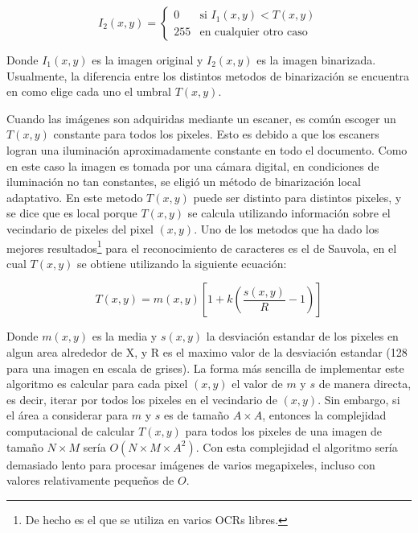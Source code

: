 \documentclass[a4paper, 11pt, oneside]{report}
\begin{document}
\begin{equation}\label{binEq}
	I_2(x,y) = \left\{ \begin{array}{ll}
		0   & \mbox{si $I_1(x,y) < T(x,y)$} \\
		255 & \mbox{en cualquier otro caso}
	\end{array} \right. 
\end{equation}

Donde $I_1(x,y)$ es la imagen original y $I_2(x,y)$ es la imagen binarizada. Usualmente, la diferencia entre los distintos metodos de binarización se encuentra en como elige cada uno el umbral $T(x,y)$.

Cuando las imágenes son adquiridas mediante un escaner, es común escoger un $T(x,y)$ constante para todos los pixeles. Esto es debido a que los escaners logran una iluminación aproximadamente constante en todo el documento. Como en este caso la imagen es tomada por una cámara digital, en condiciones de iluminación no tan constantes, se eligió un método de binarización local adaptativo. En este metodo $T(x,y)$ puede ser distinto para distintos pixeles, y se dice que es local porque $T(x,y)$ se calcula utilizando información sobre el vecindario de pixeles del pixel $(x,y)$. Uno de los metodos que ha dado los mejores resultados\footnote{De hecho es el que se utiliza en varios OCRs libres.} para el reconocimiento de caracteres es el de Sauvola, en el cual $T(x,y)$ se obtiene utilizando la siguiente ecuación:

\begin{equation}\label{rSauvola}
	T(x,y)=m(x,y)\left[ 1 + k(\frac{s(x,y)}{R}-1) \right]
\end{equation}

Donde $m(x,y)$ es la media y $s(x,y)$ la desviación estandar de los pixeles en algun area alrededor de X, y R es el maximo valor de la desviación estandar (128 para una imagen en escala de grises). La forma más sencilla de implementar este algoritmo es calcular para cada pixel $(x,y)$ el valor de $m$ y $s$ de manera directa, es decir, iterar por todos los pixeles en el vecindario de $(x,y)$. Sin embargo, si el área a considerar para $m$ y $s$ es de tamaño $A \times A$, entonces la complejidad computacional de calcular $T(x,y)$ para todos los pixeles de una imagen de tamaño $N \times M$ sería $O(N \times M \times A^{2})$. Con esta complejidad el algoritmo sería demasiado lento para procesar imágenes de varios megapixeles, incluso con valores relativamente pequeños de $O$.

\end{document}
